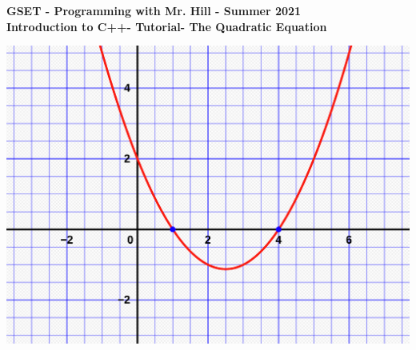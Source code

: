 \documentclass[12pt]{article}
\newcommand{\MNUM}{2} %
\newcommand{\MNAME}{Introduction to C++} %
\newcommand{\TNAME}{The Quadratic Equation} %
\begin{document}
\thispagestyle{plain}

\begin{center}
   {\bf \large GSET - Programming with Mr. Hill - Summer 2021} \vspace{5mm}\\
   {\bf \Large \MNAME \hspc -  Tutorial\hspc\MNUM\hspc - \TNAME}\vspace{3mm}\\
   
\end{center}

 \hspace*{3cm}\includegraphics[scale=.15]{quad_equ.png} 
\end{document}
